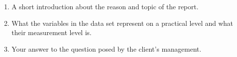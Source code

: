 \begin{enumerate}
    \item A short introduction about the reason and topic of the report.
    \item What the variables in the data set represent on a practical level and what their measurement level is. 
    
    \item Your answer to the question posed by the client's management.
\end{enumerate}

\clearpage %